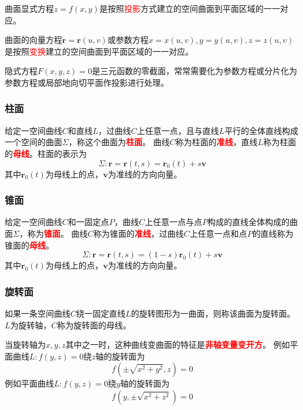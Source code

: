 曲面显式方程$z=f(x,y)$是按照\textcolor{red}{投影}方式建立的空间曲面到平面区域的一一对应。

曲面的向量方程$\bm{r} = \bm{r}(u,v)$或参数方程$x=x(u,v),y=y(u,v),z=z(u,v)$是按照\textcolor{red}{变换}建立的空间曲面到平面区域的一一对应。

隐式方程$F(x,y,z)=0$是三元函数的零截面，常常需要化为参数方程或分片化为参数方程或局部地向切平面作投影进行处理。

\subsubsection{柱面}
给定一空间曲线$C$和直线$L$，过曲线$C$上任意一点，且与直线$L$平行的全体直线构成一个空间的曲面$\Sigma$，称这个曲面为\textcolor{red}{\textbf{\textsf{柱面}}}。
曲线$C$称为柱面的\textcolor{red}{\textbf{\textsf{准线}}}，直线$L$称为柱面的\textcolor{red}{\textbf{\textsf{母线}}}。柱面的表示为
\begin{equation}
    \label{eq:柱面方程}
    \Sigma : \bm{r} = \bm{r}(t,s) = \bm{r}_0(t) + s\bm{v}
\end{equation}
其中$\bm{r}_0(t)$为母线上的点，$\bm{v}$为准线的方向向量。

\subsubsection{锥面}
给定一空间曲线$C$和一固定点$P$，曲线$C$上任意一点与点$P$构成的直线全体构成的曲面$\Sigma$，称为\textcolor{red}{\textbf{\textsf{锥面}}}。
曲线$C$称为锥面的\textcolor{red}{\textbf{\textsf{准线}}}，过曲线$C$上任意一点和点$P$的直线称为锥面的\textcolor{red}{\textbf{\textsf{母线}}}。
\begin{equation}
    \label{eq:锥面方程}
    \Sigma : \bm{r} = \bm{r}(t,s) = (1-s)\bm{r}_0(t) + s\bm{v}
\end{equation}
其中$\bm{r}_0(t)$为母线上的点，$\bm{v}$为准线的方向向量。

\subsubsection{旋转面}
如果一条空间曲线$C$绕一固定直线$L$的旋转图形为一曲面，则称该曲面为旋转面。$L$为旋转轴，$C$称为旋转面的母线。

当旋转轴为$x,y,z$其中之一时，这种曲线变曲面的特征是\textcolor{red}{\textbf{\textsf{非轴变量变开方}}}。
例如平面曲线$L:f(y,z)=0$绕$z$轴的旋转面为
\[ f(\pm\sqrt{x^2+y^2}, z) = 0 \]
例如平面曲线$L:f(y,z)=0$绕$y$轴的旋转面为
\[ f(y, \pm\sqrt{x^2+z^2}) = 0 \]

